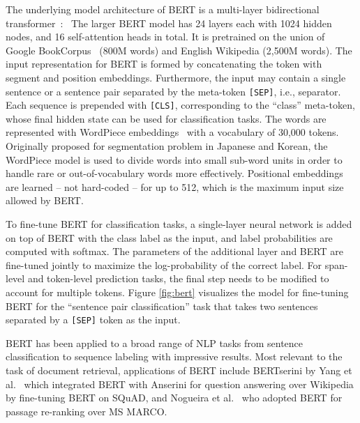 The underlying model architecture of BERT is a multi-layer bidirectional transformer~\cite{vaswani2017attention}:\
The larger BERT model has 24 layers each with 1024 hidden nodes, and 16 self-attention heads in total.
It is pretrained on the union of Google BookCorpus~\cite{zhu2015aligning} (800M words) and English Wikipedia (2,500M words).
The input representation for BERT is formed by concatenating the token with segment and position embeddings.
Furthermore, the input may contain a single sentence or a sentence pair separated by the meta-token \texttt{[SEP]}, i.e., separator.
Each sequence is prepended with \texttt{[CLS]}, corresponding to the ``class'' meta-token, whose final hidden state can be used for classification tasks.
The words are represented with WordPiece embeddings~\cite{wu2016google} with a vocabulary of 30,000 tokens.
Originally proposed for segmentation problem in Japanese and Korean, the WordPiece model is used to divide words into small sub-word units in order to handle rare or out-of-vocabulary words more effectively.
Positional embeddings are learned -- not hard-coded -- for up to 512, which is the maximum input size allowed by BERT.

To fine-tune BERT for classification tasks, a single-layer neural network is added on top of BERT with the class label as the input, and label probabilities are computed with softmax.
The parameters of the additional layer and BERT are fine-tuned jointly to maximize the log-probability of the correct label.
For span-level and token-level prediction tasks, the final step needs to be modified to account for multiple tokens.
Figure \ref{fig:bert} visualizes the model for fine-tuning BERT for the ``sentence pair classification'' task that takes two sentences separated by a \texttt{[SEP]} token as the input.

BERT has been applied to a broad range of NLP tasks from sentence classification to sequence labeling with impressive results.
Most relevant to the task of document retrieval, applications of BERT include BERTserini by Yang et al.~\cite{yang2019end} which integrated BERT with Anserini for question answering over Wikipedia by fine-tuning BERT on SQuAD, and Nogueira et al.~\cite{nogueira2019passage} who adopted BERT for passage re-ranking over MS MARCO.

